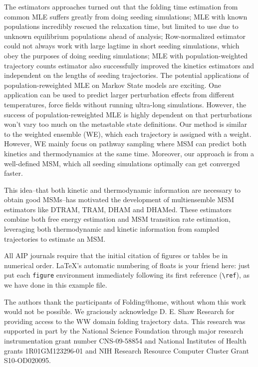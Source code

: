 \documentclass[%
 aip,
rsi,%
 amsmath,amssymb,
 reprint,%
]{revtex4-1}
\begin{document}
The estimators approaches turned out that the folding time estimation from common MLE suffers greatly from doing seeding simulations; MLE with known populations incredibly rescued the relaxation time, but limited to use due to unknown equilibrium populations ahead of analysis; Row-normalized estimator could not always work with large lagtime in short seeding simulations, which obey the purposes of doing seeding simulations; MLE with population-weighted trajectory counts estimator also successfully improved the kinetics estimators and independent on the lengths of seeding trajectories. The potential applications of population-reweighted MLE on Markov State models are exciting. One application can be used to predict larger perturbation effects from different temperatures, force fields without running ultra-long simulations. However, the success of population-reweighted MLE is highly dependent on that perturbations won’t vary too much on the metastable state definitions.  Our method is similar to the weighted ensemble (WE), which each trajectory is assigned with a weight. However, WE mainly focus on pathway sampling where MSM can predict both kinetics and thermodynamics at the same time. Moreover, our approach is from a well-defined MSM, which all seeding simulations optimally can get converged faster. 

This idea--that both kinetic and thermodynamic information are necessary to obtain good MSMs--has motivated the development of multiensemble MSM estimators like DTRAM, TRAM, DHAM and DHAMed. These estimators combine both free energy estimation and MSM transition rate estimation, leveraging both thermodynamic and kinetic information from sampled trajectories to estimate an MSM.

All AIP journals require that the initial citation of
figures or tables be in numerical order.
\LaTeX's automatic numbering of floats is your friend here:
just put each \texttt{figure} environment immediately following 
its first reference (\verb+\ref+), as we have done in this example file. 

\begin{acknowledgments}
The authors thank the participants of Folding@home, without whom this work would not be possible.  We graciously acknowledge D. E. Shaw Research for providing access to the WW domain folding trajectory data. This research was supported in part by the National Science Foundation through major research instrumentation grant number CNS-09-58854 and National Institutes of Health grants 1R01GM123296-01 and NIH Research Resource Computer Cluster Grant S10-OD020095.
\end{acknowledgments}
\end{document}
